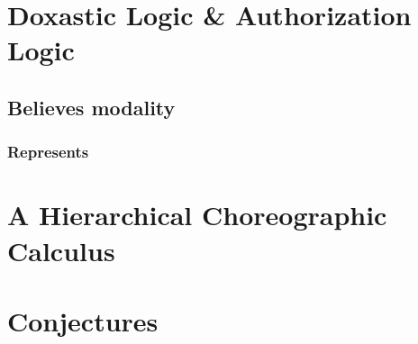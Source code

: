 \documentclass[11pt]{article}
\begin{document}
\section{Doxastic Logic \& Authorization Logic}
\label{sec:org258612a}
\subsection{Believes modality}
\label{sec:orgaa88343}
\subsubsection{Represents}
\label{sec:orga867801}
\section{A Hierarchical Choreographic Calculus}
\label{sec:org05b5587}
\section{Conjectures}
\label{sec:org719ad98}
\end{document}
